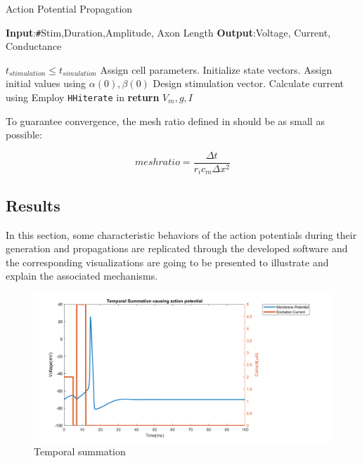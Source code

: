 \documentclass{IEEEtran}
\begin{document}
\begin{algorithm}[h]
    \caption{Action Potential Propagation}\label{alg:approp}
    \hspace*{\algorithmicindent}\textbf{Input}:\texttt{\#}Stim,Duration,Amplitude, Axon Length\newline
    \hspace*{\algorithmicindent}\textbf{Output}:Voltage, Current, Conductance
    \begin{algorithmic}[1]
    
    \Ensure $t_{stimulation} \le t_{simulation}$
    \State Assign cell parameters. 
    \State Initialize state vectors. 
    \State Assign initial values using $\alpha(0),\beta(0)$ 
    \State Design stimulation vector. 
        \State Calculate current using 
        \State Employ \texttt{HHiterate} in 
    \EndFor
    \EndFor
    \State \textbf{return} $V_m, g, I$
    \end{algorithmic}
\end{algorithm}

To guarantee convergence, the mesh ratio defined in  should be as small as possible:

\begin{equation}
    mesh ratio = \frac{\Delta t}{r_i c_m \Delta x^2} \label{eqn:mesh}
\end{equation}

\subsection{Results}

In this section, some characteristic behaviors of the action potentials during their generation and propagations are replicated through the developed software and the corresponding visualizations are going to be presented to illustrate and explain the associated mechanisms.

\begin{figure}[h]
\centering
\includegraphics[width=\textwidth]{Fig1.png}
\caption{Temporal summation}\label{fig:tempsum}
\end{figure}
\end{document}
